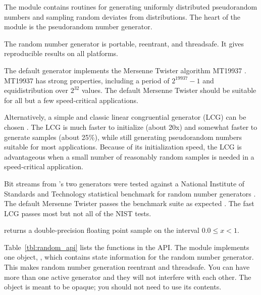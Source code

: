 The  module contains routines for generating uniformly
distributed pseudorandom numbers and sampling random deviates from
distributions. The heart of the module is the 
pseudorandom number generator.

The  random number generator is portable,
reentrant, and threadsafe. It gives reproducible results on all
platforms.

The default  generator implements the Mersenne
Twister algorithm MT19937 \citep{Matsumoto98}. MT19937 has strong
properties, including a period of $2^{19937}-1$ and equidistribution
over $2^{32}$ values. The default Mersenne Twister should be suitable
for all but a few speed-critical applications.

Alternatively, a simple and classic linear congruential generator
(LCG) can be chosen \citep{Knu-81a}. The LCG is much faster to
initialize (about 20x) and somewhat faster to generate samples (about
25\%), while still generating pseudorandom numbers suitable for most
applications. Because of its initialization speed, the LCG is
advantageous when a small number of reasonably random samples is
needed in a speed-critical application.

Bit streams from 's two generators were tested
against a National Institute of Standards and Technology statistical
benchmark for random number generators \citep{NIST08}.  The default
Mersenne Twister passes the benchmark suite as expected
\citep{Matsumoto98}. The fast LCG passes most but not all of the NIST
tests.

 returns a double-precision floating point sample
on the interval $0.0 \leq x < 1$. 

Table~\ref{tbl:random_api} lists the functions in the 
API. The module implements one object, , which
contains state information for the random number generator.  This
makes random number generation reentrant and threadsafe. You can have
more than one active generator and they will not interfere with each
other. The object is meant to be opaque; you should not need to use
its contents.  

